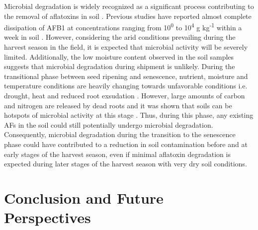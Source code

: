 \begin{refsection}
Microbial degradation is widely recognized as a significant process contributing to the removal of aflatoxins in soil \citep{fouche2020aflatoxins}. Previous studies have reported almost complete dissipation of AFB1 at concentrations ranging from 10\textsuperscript{0} to 10\textsuperscript{4} \textmu g kg\textsuperscript{-1}  within a week in soil \citep{angle1980decomposition, angle1986aflatoxin, accinelli2008aspergillus}. However, considering the arid conditions prevailing during the harvest season in the field, it is expected that microbial activity will be severely limited. Additionally, the low moisture content observed in the soil samples suggests that microbial degradation during shipment is unlikely. During the transitional phase between seed ripening and senescence, nutrient, moisture and temperature conditions are heavily changing towards unfavorable conditions i.e. drought, heat and reduced root exsudation \citep{zhalnina2018dynamic, cotta2013temporal}. However, large amounts of carbon and nitrogen are released by dead roots and it was shown that soils can be hotspots of microbial activity at this stage \citep{spohn2014spatial}. Thus, during this phase, any existing AFs in the soil could still potentially undergo microbial degradation. Consequently, microbial degradation during the transition to the senescence phase could have contributed to a reduction in soil contamination before and at early stages of the harvest season, even if minimal aflatoxin degradation is expected during later stages of the harvest season with very dry soil conditions.

\section{Conclusion and Future Perspectives}


\end{refsection}
